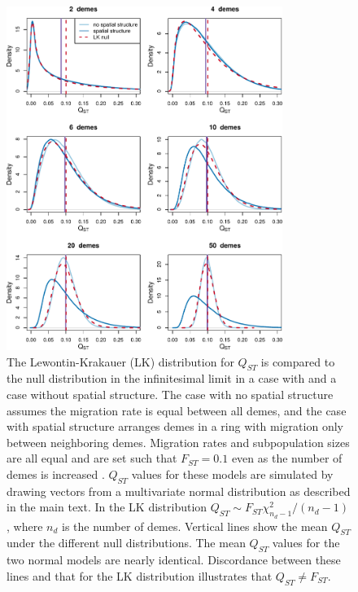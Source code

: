 \begin{figure}
  \centering
  \includegraphics[width=0.8\textwidth]{figures/qst_deme_compare.pdf}
  \caption{\small The Lewontin-Krakauer (LK) distribution for $Q_{ST}$ is
    compared to the null distribution in the infinitesimal limit in a case with
    and a case without spatial structure. The case with no spatial structure
    assumes the migration rate is equal between all demes, and the case with
    spatial structure arranges demes in a ring with migration only between
    neighboring demes. Migration rates and subpopulation sizes are all equal and
    are set such that $F_{ST}=0.1$ even as the number of demes is increased
    \citep{Slatkin1991}. $Q_{ST}$ values for these models are simulated by
    drawing vectors from a multivariate normal distribution as described in the
    main text. In the LK distribution $Q_{ST}\sim F_{ST}\chi^2_{n_d -
      1}/(n_d-1)$, where $n_d$ is the number of demes. Vertical lines show the
    mean $Q_{ST}$ under the different null distributions. The mean $Q_{ST}$
    values for the two normal models are nearly identical. Discordance between
    these lines and that for the LK distribution illustrates that $Q_{ST} \neq
    F_{ST}$.}
  \label{fig:qst_deme}
\end{figure}
